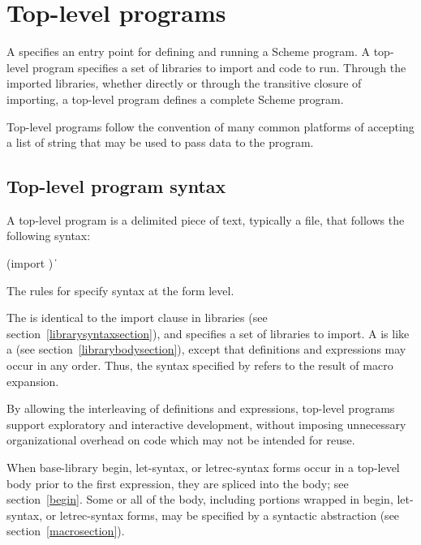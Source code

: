 \chapter{Top-level programs}
\label{programchapter}

A  specifies an entry point for defining and running
a Scheme program.  A top-level program specifies a set of libraries to import and
code to run.  Through the imported libraries, whether directly or through the
transitive closure of importing, a top-level program defines a complete Scheme
program.

Top-level programs follow the convention of many common platforms of accepting 
a list of string  that may be used to
pass data to the program.

\section{Top-level program syntax}
\label{programsyntaxsection}

A top-level program is a delimited piece of text, typically a file, that follows
the following syntax:
%
\begin{grammar}
 \:  
 \: (import )
 \: 
 \:  \| 
\end{grammar}
%
The rules for  specify syntax at the form level.

The  is identical to the import clause in
libraries (see section~\ref{librarysyntaxsection}), 
and specifies a set of libraries to import.  A  is like a  (see
section~\ref{librarybodysection}), except that 
definitions and expressions may occur in any order.  Thus, the syntax
specified by  refers to the result of macro
expansion.

\begin{rationale}
By allowing the interleaving of definitions and expressions, top-level 
programs support exploratory and interactive development, without 
imposing unnecessary organizational overhead on code which may not be 
intended for reuse.
\end{rationale}

When base-library {\cf begin}, {\cf let-syntax}, or {\cf letrec-syntax} forms
occur in a top-level body prior to the first
expression, they are spliced into the body; see section~\ref{begin}.
Some or all of the body, including portions wrapped in {\cf begin},
{\cf let-syntax}, or {\cf letrec-syntax}
forms, may be specified by a syntactic abstraction
(see section~\ref{macrosection}).

